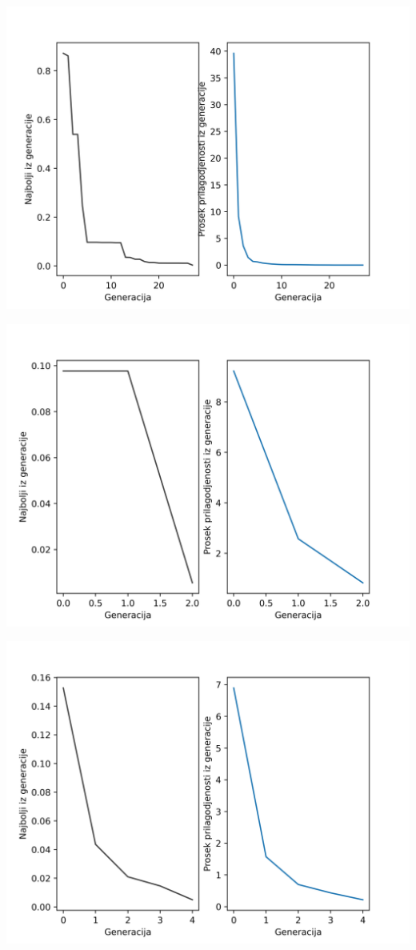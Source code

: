 \documentclass[a4paper,11pt]{book}
\begin{document}
\includegraphics{grafik20-0.png}

\includegraphics{grafik100-0.png}

\includegraphics{grafik150-0.png}
\end{document}
